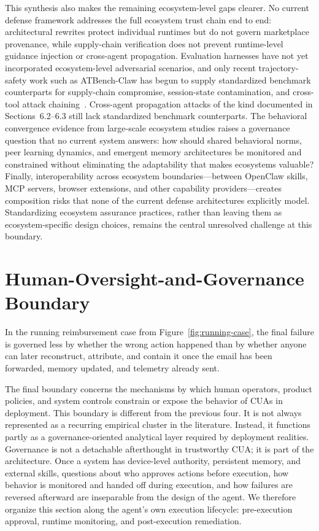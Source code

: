 This synthesis also makes the remaining ecosystem-level gaps clearer. No current defense framework addresses the full ecosystem trust chain end to end: architectural rewrites protect individual runtimes but do not govern marketplace provenance, while supply-chain verification does not prevent runtime-level guidance injection or cross-agent propagation. Evaluation harnesses have not yet incorporated ecosystem-level adversarial scenarios, and only recent trajectory-safety work such as ATBench-Claw has begun to supply standardized benchmark counterparts for supply-chain compromise, session-state contamination, and cross-tool attack chaining~\cite{atbenchclaw2026}. Cross-agent propagation attacks of the kind documented in Sections~6.2--6.3 still lack standardized benchmark counterparts. The behavioral convergence evidence from large-scale ecosystem studies raises a governance question that no current system answers: how should shared behavioral norms, peer learning dynamics, and emergent memory architectures be monitored and constrained without eliminating the adaptability that makes ecosystems valuable? Finally, interoperability across ecosystem boundaries---between OpenClaw skills, MCP servers, browser extensions, and other capability providers---creates composition risks that none of the current defense architectures explicitly model. Standardizing ecosystem assurance practices, rather than leaving them as ecosystem-specific design choices, remains the central unresolved challenge at this boundary.

\section{Human-Oversight-and-Governance Boundary}
\label{sec:governance}

In the running reimbursement case from Figure~\ref{fig:running-case}, the final failure is governed less by whether the wrong action happened than by whether anyone can later reconstruct, attribute, and contain it once the email has been forwarded, memory updated, and telemetry already sent.
 

The final boundary concerns the mechanisms by which human operators, product policies, and system controls constrain or expose the behavior of CUAs in deployment. This boundary is different from the previous four. It is not always represented as a recurring empirical cluster in the literature. Instead, it functions partly as a governance-oriented analytical layer required by deployment realities. Governance is not a detachable afterthought in trustworthy CUA; it is part of the architecture. Once a system has device-level authority, persistent memory, and external skills, questions about who approves actions before execution, how behavior is monitored and handed off during execution, and how failures are reversed afterward are inseparable from the design of the agent. We therefore organize this section along the agent's own execution lifecycle: pre-execution approval, runtime monitoring, and post-execution remediation.


